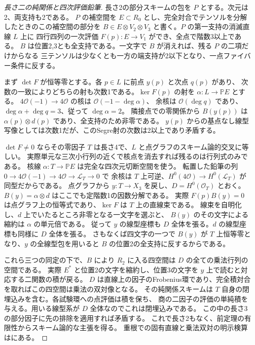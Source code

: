 \begin{proof}[長さ二の純関係と四次評価鉛筆]
長さ2の部分スキームの包を $P$ とする。次元は2、両支持も2である。
$P$ の補空間を $E\subset R_0$ とし、完全対合でテンソルを分解したときのこの補空間の部分を
$B\in E\otimes V_2\otimes V_3$ と書く。$P$ の第一支持の消滅直線 $L$ 上に
四行四列の一次評価 $F(p):E\to V_1$ ができ、全点で階数3以上である。
$B$ は位置2,3とも全支持である。一文字で $B$ が消えれば、残る $P$ の二項だけからなる
三テンソルは少なくとも一方の端支持が2以下となり、一点ファイバー条件に反する。

まず $\det F$ が恒等零とする。各 $p\in L$ に前点 $y(p)$ と次点 $q(p)$ があり、
次数の一致によりどちらの射も次数1である。$\ker F(p)$ の射を $\alpha:L\to\mathbb P E$ とする。
$4\mathcal O(-1)\to4\mathcal O$ の核は $\mathcal O(-1-\deg\alpha)$、
余核は $\mathcal O(\deg q)$ であり、$\deg\alpha+\deg q=3$、従って $\deg\alpha=2$。
隣接点での零関係から $B(y(p))$ は $\alpha(p)\otimes d(p)$ であり、全支持のため非零である。
$y(p)$ からの基点なし線型写像としては次数1だが、このSegre射の次数は2以上であり矛盾する。

$\det F\ne0$ ならその零因子 $T$ は長さ4で、$L$ と点グラフのスキーム論的交叉に等しい。
実際単元な三次小行列の近くで核点を消去すれば残るのは行列式のみである。
核線 $\alpha:T\to\mathbb P E$ は完全な四次元切断空間を使う。
転置した鉛筆の列 $0\to4\mathcal O(-1)\to4\mathcal O\to\mathcal L_T\to0$ で
余核は $T$ 上可逆、$H^0(4\mathcal O)\to H^0(\mathcal L_T)$ が同型だからである。
点グラフから $y:T\to X_3$ を戻し、$D=H^0(\mathcal O_T)$ とおく。
$B(y)=\alpha\otimes d$ はここでも定階数1の因数分解である。
実際 $F(p)B(y)=0$ は点グラフ上の恒等式であり、$\ker F$ は $T$ 上の直線束である。
線束を自明化し、$d$ 上でいたるところ非零となる一文字を選ぶと、
$B(y)$ のその文字による縮約は $\alpha$ の単元倍である。
従って $y$ の線型座標も $D$ 全体を張る。$d$ の線型座標も同様に $D$ 全体を張る。
さもなくば四文字の一つで $B(y)$ が $T$ 上恒等零となり、$y$ の全線型包を用いると
$B$ の位置2の全支持に反するからである。

これら三つの同定の下で、$B$ により $R_2$ に入る四空間は $D$ の全ての乗法行列の空間である。
実際 $E^*$ と位置2の文字を縮約し、位置3の文字を $y$ 上で読むと対応する二関数の積が戻る。
$D$ は直線上の因子のFrobenius環であり、完全積対合を取ればこの四空間は乗法の双対像となる。
その純関係スキームは $T$ 自身の閉埋込みを含む。各試験環への点評価は積を保ち、
商の二因子の評価の単純積を与える。用いる線型系が $D$ 全体なのでこれは閉埋込みである。
この中の長さ3の部分因子に先の排除を適用すれば矛盾する。
これで長さ2もなく、前定理の有限性からスキーム論的な主張を得る。
重根での固有直線と乗法双対の明示検算はにある。
\end{proof}
